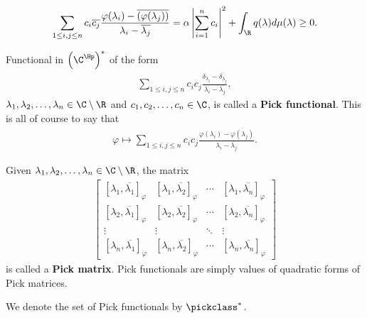 \begin{align*}
	\sum_{1 \leq i, j \leq n} c_{i} \overline{c_{j}} \frac{\varphi(\lambda_{i}) - \overline{(\varphi(\lambda_{j}))}}{\lambda_{i} - \overline{\lambda_{j}}} = \alpha \left|\sum_{i = 1}^{n} c_{i}\right|^2 + \int_{\R} q(\lambda) d \mu (\lambda) \geq 0.
\end{align*}

\begin{maar}
	Functional in $\left(\C^{\Hp}\right)^{*}$ of the form
	\begin{align*}
		\sum_{1 \leq i, j \leq n} c_{i} c_{j} \frac{\delta_{\lambda_{i}} - \overline{\delta_{\lambda_{j}}}}{\lambda_{i} - \overline{\lambda_{j}}},
	\end{align*}
	$\lambda_{1}, \lambda_{2}, \ldots, \lambda_{n} \in \C \setminus \R$ and $c_{1}, c_{2}, \ldots, c_{n} \in \C$, is called a \textbf{Pick functional}. This is all of course to say that
	\begin{align*}
		\varphi \mapsto \sum_{1 \leq i, j \leq n} c_{i} c_{j} \frac{\varphi(\lambda_{i}) - \overline{\varphi(\lambda_{j})}}{\lambda_{i} - \overline{\lambda_{j}}}.
	\end{align*}
\end{maar}

Given $\lambda_{1}, \lambda_{2}, \ldots, \lambda_{n} \in \C \setminus \R$, the matrix
\begin{align*}\label{Pick_matrix}
	\begin{bmatrix}
		[\lambda_{1}, \overline{\lambda_{1}}]_{\varphi} & [\lambda_{1}, \overline{\lambda_{2}}]_{\varphi} & \cdots & [\lambda_{1}, \overline{\lambda_{n}}]_{\varphi} \\
		[\lambda_{2}, \overline{\lambda_{1}}]_{\varphi} & [\lambda_{2}, \overline{\lambda_{2}}]_{\varphi} & \cdots & [\lambda_{2}, \overline{\lambda_{n}}]_{\varphi} \\
		\vdots & \vdots & \ddots & \vdots \\
		[\lambda_{n}, \overline{\lambda_{1}}]_{\varphi} & [\lambda_{n}, \overline{\lambda_{2}}]_{\varphi} & \cdots &  [\lambda_{n}, \overline{\lambda_{n}}]_{\varphi}
	\end{bmatrix}
\end{align*}
is called a \textbf{Pick matrix}. Pick functionals are simply values of quadratic forms of Pick matrices.

We denote the set of Pick functionals by $\pickclass^{*}$.

